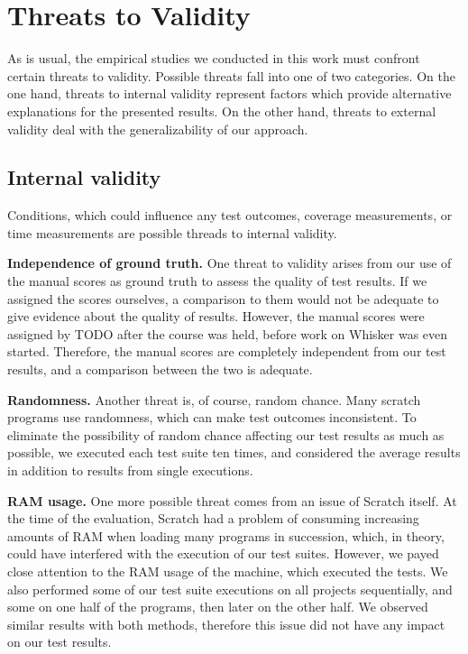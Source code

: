 \section{Threats to Validity}
\label{sec:threats_to_validity}

As is usual, the empirical studies we conducted in this work must confront certain threats to validity.
Possible threats fall into one of two categories.
On the one hand, threats to internal validity represent factors which provide alternative explanations for the presented results.
On the other hand, threats to external validity deal with the generalizability of our approach.

\subsection{Internal validity}

Conditions, which could influence any test outcomes, coverage measurements,
or time measurements are possible threads to internal validity.
\parspace

\textbf{Independence of ground truth.}
One threat to validity arises from our use of the manual scores as
ground truth to assess the quality of test results.
If we assigned the scores ourselves,
a comparison to them would not be adequate to give evidence about the quality of results.
However, the manual scores were assigned by TODO after the course was held,
before work on Whisker was even started.
Therefore, the manual scores are completely independent from our test results,
and a comparison between the two is adequate.
\parspace

\textbf{Randomness.}
Another threat is, of course, random chance.
Many scratch programs use randomness, which can make test outcomes inconsistent.
To eliminate the possibility of random chance affecting our test results as much as possible, we executed each test suite ten times,
and considered the average results in addition to results from single executions.
\parspace

\textbf{RAM usage.}
One more possible threat comes from an issue of Scratch itself.
At the time of the evaluation, Scratch had a problem of consuming increasing amounts of RAM when loading many programs in succession,
which, in theory, could have interfered with the execution of our test suites.
However, we payed close attention to the RAM usage of the machine, which executed the tests.
We also performed some of our test suite executions on all projects sequentially,
and some on one half of the programs, then later on the other half.
We observed similar results with both methods, therefore this issue did not have any impact on our test results.

